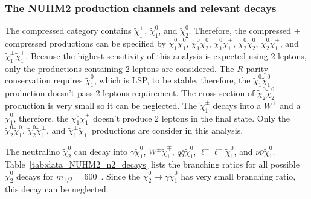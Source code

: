 
\subsubsection{The NUHM2 production channels and relevant decays}
\label{subsubsec:data_channels_and_decays}
The compressed category contains $\widetilde{\chi}^{\pm}_{1}$, $\widetilde{\chi}^{0}_{1}$, and $\widetilde{\chi}^{0}_{2}$.
Therefore, the compressed + compressed productions can be specified by $\widetilde{\chi}^{0}_{1} \widetilde{\chi}^{0}_{1}$, $\widetilde{\chi}^{0}_{1} \widetilde{\chi}^{0}_{2}$, $\widetilde{\chi}^{0}_{1} \widetilde{\chi}^{\pm}_{1}$, $\widetilde{\chi}^{0}_{2} \widetilde{\chi}^{0}_{2}$, $\widetilde{\chi}^{0}_{2} \widetilde{\chi}^{\pm}_{1}$, and $\widetilde{\chi}^{\pm}_{1} \widetilde{\chi}^{\mp}_{1}$.
Because the highest sensitivity of this analysis is expected using 2 leptons, only the productions containing 2 leptons are considered.
The $R$-parity conservation requires $\widetilde{\chi}^{0}_{1}$, which is LSP, to be stable, therefore, the $\widetilde{\chi}^{0}_{1} \widetilde{\chi}^{0}_{1}$ production doesn't pass 2 leptons requirement.
The cross-section of $\widetilde{\chi}^{0}_{2} \widetilde{\chi}^{0}_{2}$ production is very small so it can be neglected.
The $\widetilde{\chi}^{\pm}_{1}$ decays into a $W^{\pm}$ and a $\widetilde{\chi}^{0}_{1}$, therefore, the $\widetilde{\chi}^{0}_{1} \widetilde{\chi}^{\pm}_{1}$ doesn't produce 2 leptons in the final state.
Only the $\widetilde{\chi}^{0}_{2} \widetilde{\chi}^{0}_{1}$, $\widetilde{\chi}^{0}_{2} \widetilde{\chi}^{\pm}_{1}$, and $\widetilde{\chi}^{\pm}_{1} \widetilde{\chi}^{\mp}_{1}$ productions are consider in this analysis.

The neutralino $\widetilde{\chi}^{0}_{2}$ can decay into $\gamma \widetilde{\chi}^{0}_{1}$, $W^{\pm} \widetilde{\chi}^{\mp}_{1}$, $q\bar{q} \widetilde{\chi}^{0}_{1}$, $\ell^{+}\ell^{-} \widetilde{\chi}^{0}_{1}$, and $\nu\bar{\nu} \widetilde{\chi}^{0}_{1}$.
Table~\ref{tab:data_NUHM2_n2_decays} lists the branching ratios for all possible $\widetilde{\chi}^{0}_{2}$ decays for $m_{1/2} = 600$~{\GeV}.
Since the $\widetilde{\chi}^{0}_{2} \to \gamma \widetilde{\chi}^{0}_{1}$ has very small branching ratio, this decay can be neglected.

